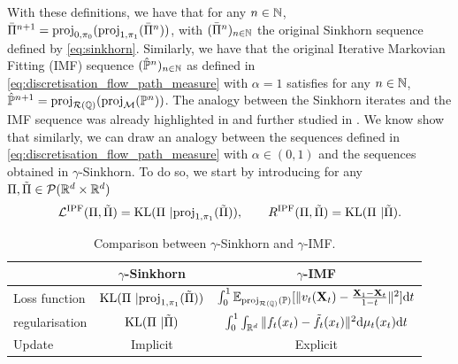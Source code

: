 \documentclass{article}
\begin{document}
With these definitions, we have that for any $n \in \mathbb{N}$, $\bar{\Pi}^{n+1} = \mathrm{proj}_{0, \pi_0}(\mathrm{proj}_{1, \pi_1}(\bar{\Pi}^n))$, with $(\bar{\Pi}^n)_{n \in \mathbb{N}}$ the original Sinkhorn sequence defined by \eqref{eq:sinkhorn}. Similarly, we have that the original Iterative Markovian Fitting (IMF) sequence $(\hat{\mathbb{P}}^n)_{n \in \mathbb{N}}$ as defined in \eqref{eq:discretisation_flow_path_measure} with $\alpha = 1$ satisfies for any $n \in \mathbb{N}$, $\hat{\mathbb{P}}^{n+1} = \mathrm{proj}_{\mathcal{R}(\mathbb{Q})}(\mathrm{proj}_{\mathcal{M}}(\mathbb{P}^n))$. The analogy between the Sinkhorn iterates and the IMF sequence was already highlighted in \cite{shi2023DSBM,peluchetti_diffusion_2023} and further studied in \cite{brekelmans2023schrodinger}. We know show that similarly, we can draw an analogy between the sequences defined in \eqref{eq:discretisation_flow_path_measure} with $\alpha \in (0,1)$ and the sequences obtained in $\gamma$-Sinkhorn. To do so, we start by introducing 
for any $\Pi, \tilde{\Pi} \in \mathcal{P}(\mathbb{R}^d \times \mathbb{R}^d)$
\begin{equation}
    \mathcal{L}^{\mathrm{IPF}}(\Pi, \tilde{\Pi}) = \mathrm{KL}(\Pi \ | \mathrm{proj}_{1, \pi_1}(\tilde{\Pi})) , \qquad R^{\mathrm{IPF}}(\Pi, \tilde{\Pi}) =  \mathrm{KL}(\Pi \ | \tilde{\Pi}) . 
\end{equation}

\begin{table}
\centering
\begin{tabular}{|l|c|c|}
\hline
 & $\gamma$-Sinkhorn & $\gamma$-IMF \\
 \hline \hline
Loss function & $\mathrm{KL}(\Pi \ | \mathrm{proj}_{1, \pi_1}(\tilde{\Pi}))$ & $ \int_0^1 \mathbb{E}_{\mathrm{proj}_{\mathcal{R}(\mathbb{Q})}(\mathbb{P})} [\| v_t(\mathbf{X}_t)-\tfrac{\mathbf{X}_1 - \mathbf{X}_t}{1-t} \|^2]  \mathrm{d} t$\\
regularisation & $\mathrm{KL}(\Pi \ | \tilde{\Pi}) $ & $ \int_0^1 \int_{\mathbb{R}^d} \| f_t(x_t) - \tilde{f}_t(x_t)\|^2 \mathrm{d} \mu_t(x_t) \mathrm{d} t$ \\
Update & Implicit & Explicit  \\
\hline
\end{tabular}
\caption{Comparison between $\gamma$-Sinkhorn and $\gamma$-IMF.}
\label{table:comparison_flow}
\end{table}
\end{document}

